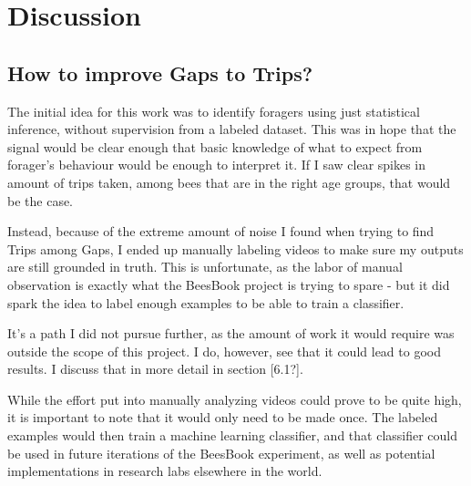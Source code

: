 
\chapter{Discussion}  %

\ifpdf
    \graphicspath{{Chapters/Chapter5/Figs/Raster/}{Chapters/Chapter5/Figs/PDF/}{Chapters/Chapter5/Figs/}}
\else
    \graphicspath{{Chapters/Chapter5/Figs/Vector/}{Chapters/Chapter5/Figs/}}
\fi


\section{How to improve Gaps to Trips?}

The initial idea for this work was to identify foragers using just statistical inference, without supervision from a labeled dataset. This was in hope that the 
signal would be clear enough that basic knowledge of what to expect from forager's behaviour
would be enough to interpret it. If I saw clear spikes in amount of trips taken, among bees that are in the right age groups, that would be the case.

Instead, because of the extreme amount of noise I found when trying to find Trips among Gaps, I ended up manually labeling videos to make sure my outputs are still grounded in truth. This is unfortunate, 
as the labor of manual observation is exactly what the BeesBook project is trying to spare - but it did spark the idea to label enough examples to be able to train a classifier.

It's a path I did not pursue further, as the amount of work it would require was outside the scope of this project. I do, however, see that it could lead to good results. I discuss that in more detail in section [6.1?].

While the effort put into manually analyzing videos could prove to be quite high, it is important to note that it would only need to be made once. The labeled examples would then train a machine learning classifier, and that classifier could be used in future iterations of the BeesBook experiment, as well as potential implementations in research labs elsewhere in the world.

